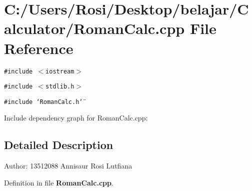 \section{C:/Users/Rosi/Desktop/belajar/Calculator/Roman\-Calc.cpp File Reference}
\label{_roman_calc_8cpp}
{\tt \#include $<$iostream$>$}\par
{\tt \#include $<$stdlib.h$>$}\par
{\tt \#include \char`\"{}Roman\-Calc.h\char`\"{}}\par


Include dependency graph for Roman\-Calc.cpp:

\subsection{Detailed Description}
\begin{Desc}
\item[Author:]13512088 Annisaur Rosi Lutfiana \end{Desc}


Definition in file {\bf Roman\-Calc.cpp}.